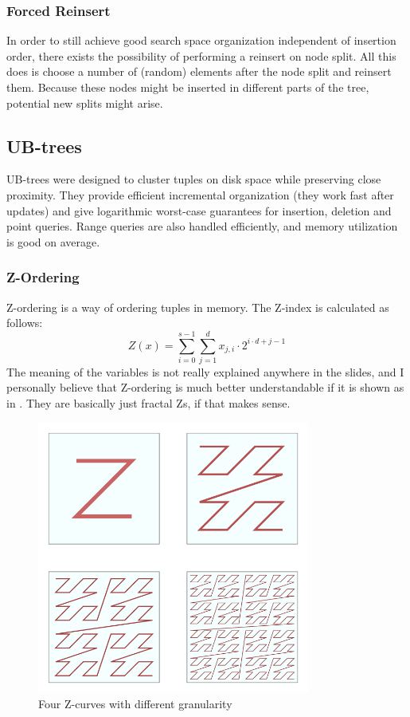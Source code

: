 \documentclass{article}
\begin{document}
\subsubsection{Forced Reinsert}
In order to still achieve good search space organization independent of insertion order, there exists the possibility of performing a reinsert on node split.
All this does is choose a number of (random) elements after the node split and reinsert them.
Because these nodes might be inserted in different parts of the tree, potential new splits might arise.

\subsection{UB-trees}
UB-trees were designed to cluster tuples on disk space while preserving close proximity.
They provide efficient incremental organization (they work fast after updates) and give logarithmic worst-case guarantees for insertion, deletion and point queries.
Range queries are also handled efficiently, and memory utilization is good on average.

\subsubsection{Z-Ordering}
Z-ordering is a way of ordering tuples in memory.
The Z-index is calculated as follows:
\begin{equation}
    Z(x) = \sum_{i=0}^{s-1} \sum_{j=1}^d x_{j,i} \cdot 2^{i \cdot d + j -1}
\end{equation}
The meaning of the variables is not really explained anywhere in the slides, and I personally believe that Z-ordering is much better understandable if it is shown as in .
They are basically just fractal Zs, if that makes sense.

\begin{figure}[p]
    \centering
    \includegraphics[width=0.8\textwidth]{z-order.png}
    \caption{Four Z-curves with different granularity}
    \label{fig:z-order}
\end{figure}
\end{document}
